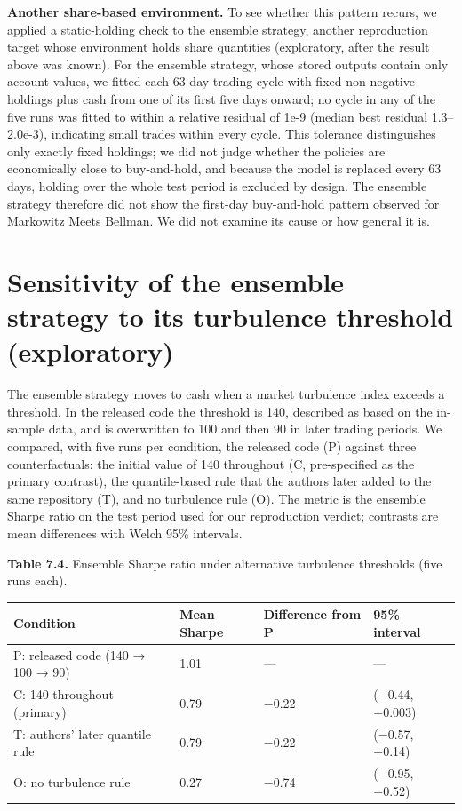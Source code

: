 \documentclass[12pt,a4paper]{report}
\begin{document}
\textbf{Another share-based environment.} To see whether this pattern
recurs, we applied a static-holding check to the ensemble strategy,
another reproduction target whose environment holds share quantities
(exploratory, after the result above was known). For the ensemble
strategy, whose stored outputs contain only account values, we fitted
each 63-day trading cycle with fixed non-negative holdings plus cash
from one of its first five days onward; no cycle in any of the five runs
was fitted to within a relative residual of 1e-9 (median best residual
1.3--2.0e-3), indicating small trades within every cycle. This tolerance
distinguishes only exactly fixed holdings; we did not judge whether the
policies are economically close to buy-and-hold, and because the model
is replaced every 63 days, holding over the whole test period is
excluded by design. The ensemble strategy therefore did not show the
first-day buy-and-hold pattern observed for Markowitz Meets Bellman. We
did not examine its cause or how general it is.

\section{Sensitivity of the ensemble strategy to its turbulence
threshold
(exploratory)}\label{sensitivity-of-the-ensemble-strategy-to-its-turbulence-threshold-exploratory}

The ensemble strategy moves to cash when a market turbulence index
exceeds a threshold. In the released code the threshold is 140,
described as based on the in-sample data, and is overwritten to 100 and
then 90 in later trading periods. We compared, with five runs per
condition, the released code (P) against three counterfactuals: the
initial value of 140 throughout (C, pre-specified as the primary
contrast), the quantile-based rule that the authors later added to the
same repository (T), and no turbulence rule (O). The metric is the
ensemble Sharpe ratio on the test period used for our reproduction
verdict; contrasts are mean differences with Welch 95\% intervals.

\textbf{Table 7.4.} Ensemble Sharpe ratio under alternative turbulence
thresholds (five runs each).

{\small
\begin{longtable}[]{@{}llll@{}}
\toprule\noalign{}
Condition & Mean Sharpe & Difference from P & 95\% interval \\
\midrule\noalign{}
\endhead
\bottomrule\noalign{}
\endlastfoot
P: released code (140 → 100 → 90) & 1.01 & --- & --- \\
C: 140 throughout (primary) & 0.79 & −0.22 & (−0.44, −0.003) \\
T: authors' later quantile rule & 0.79 & −0.22 & (−0.57, +0.14) \\
O: no turbulence rule & 0.27 & −0.74 & (−0.95, −0.52) \\
\end{longtable}
}
\end{document}
